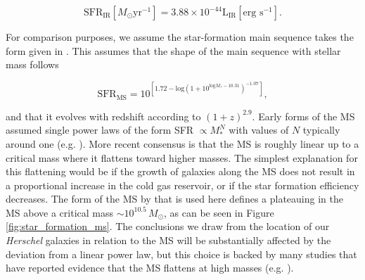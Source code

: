\begin{equation}
	\textrm{SFR}_{\textrm{IR}} [M_\odot\textrm{yr}^{-1}] = 3.88\times10^{-44}\textrm{L}_{\textrm{IR}} [\textrm{erg s}^{-1}].
	\label{eq:LIR_SFR_calibration}
\end{equation}

For comparison purposes, we assume the star-formation main sequence takes the form given in \citealt{Scoville_2017}. This assumes that the shape of the main sequence with stellar mass follows 

\begin{equation}
	\textrm{SFR}_{\textrm{MS}} = 10^{[1.72-\textrm{log}(1+10^{\textrm{log}M_*-10.31})^{-1.07}]},
	\label{eq:scoville_ms}
\end{equation}

\noindent and that it evolves with redshift according to $(1+z)^{2.9}$. Early forms of the MS assumed single power laws of the form SFR $\propto M_*^N$ with values of $N$ typically around one (e.g. \citealt{Daddi_2007, Elbaz_2007}). More recent consensus is that the MS is roughly linear up to a critical mass where it flattens toward higher masses. The simplest explanation for this flattening would be if the growth of galaxies along the MS does not result in a proportional increase in the cold gas reservoir, or if the star formation efficiency decreases. The form of the MS by \citealt{Scoville_2017} that is used here defines a plateauing in the MS above a critical mass $\sim 10^{10.5}\,M_\odot$, as can be seen in Figure \ref{fig:star_formation_ms}. The conclusions we draw from the location of our \textit{Herschel} galaxies in relation to the MS will be substantially affected by the deviation from a linear power law, but this choice is backed by many studies that have reported evidence that the MS flattens at high masses (e.g. \citealt{Magnelli_2014, Whitaker_2014, Schreiber_2015, Tomczak_2016}).

